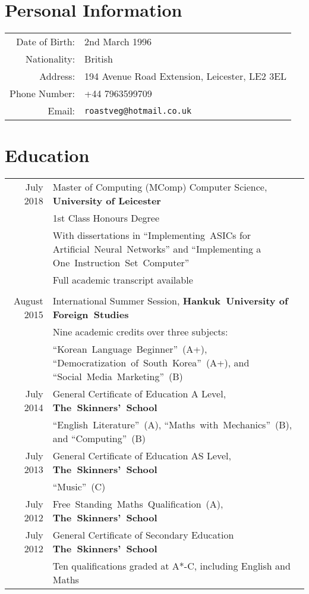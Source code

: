 \documentclass[a4paper]{article}
\begin{document}
\pagestyle{empty}
\par{ \par}

\section*{Personal Information}
\begin{tabular}{rl}
  Date of Birth: & 2nd March 1996 \\
  Nationality: & British \\
  Address: & 194 Avenue Road Extension, Leicester, LE2 3EL \\
  Phone Number: & +44 7963599709 \\
  Email: & \texttt{roastveg@hotmail.co.uk}
\end{tabular}

\section*{Education}
\begin{tabular}{rp{11.75cm}}
  July 2018 & Master of Computing (MComp) Computer Science, \textbf{University of Leicester} \\
  & 1st Class Honours Degree \\
  & With dissertations in ``Implementing~ASICs for Artificial~Neural~Networks'' and ``Implementing a One~Instruction~Set~Computer'' \\
  & Full academic transcript available \\
  \multicolumn{2}{c}{} \\
  
  August 2015 & International Summer Session, \textbf{Hankuk~University of Foreign~Studies} \\
  & Nine academic credits over three subjects: \\
  & ``Korean~Language~Beginner''~(A+), ``Democratization~of~South~Korea''~(A+), and ``Social~Media~Marketing''~(B) \\
  
  July 2014 & General Certificate of Education A Level, \textbf{The~Skinners'~School} \\
  & ``English~Literature''~(A), ``Maths~with~Mechanics''~(B), and ``Computing''~(B) \\
  July 2013 & General Certificate of Education AS Level, \textbf{The~Skinners'~School} \\
  & ``Music''~(C) \\
  July 2012 & Free~Standing~Maths~Qualification~(A), \textbf{The~Skinners'~School} \\
  July 2012 & General Certificate of Secondary Education \textbf{The~Skinners'~School} \\
  & Ten qualifications graded at A*-C, including English and Maths
\end{tabular}
\end{document}
